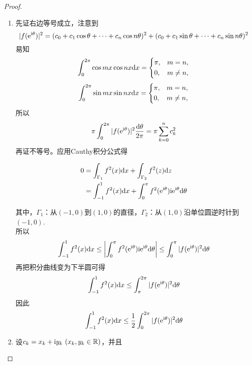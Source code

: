 \begin{proof}

    \begin{enumerate}

        \item 
        先证右边等号成立，注意到
        \[|f(\mathrm{e}^{\mathrm{i} \theta})|^2 = (c_0 + c_1 \cos{\theta} + \cdots + c_n \cos{n\theta})^2 + (c_0 + c_1 \sin{\theta} + \cdots + c_n \sin{n\theta})^2\]
        易知
        \[
            \int_{0}^{2\pi}{\cos{mx}\cos{nx}}\mathrm{d} x = \left\{ 
            \begin{aligned}
                & \pi, & m = n, \\
                & 0, & m \neq n,
            \end{aligned} \right.
        \]
        \[
            \int_{0}^{2\pi}{\sin{mx}\sin{nx}}\mathrm{d} x = \left\{ 
            \begin{aligned}
                & \pi, & m = n, \\
                & 0, & m \neq n,
            \end{aligned} \right.
        \]
        所以
        \[\pi \int_{0}^{2\pi}{|f(\mathrm{e}^{\mathrm{i} \theta})|^2}\dfrac{\mathrm{d} \theta}{2 \pi} = \pi \sum\limits_{k = 0}^{n}{c_k^2}\]
        再证不等号。应用\textup{Cauthy}积分公式得
        
        \begin{align*}
            0 & = \int_{\Gamma_1}{f^2(x)}\mathrm{d} x + \int_{\Gamma_2}{f^2(z)}\mathrm{d} z \\
            & = \int_{-1}^{1}{f^2(x)}\mathrm{d} x + \int_{0}^{\pi}{f^2(\mathrm{e}^{\mathrm{i} \theta})\mathrm{i} \mathrm{e}^{\mathrm{i} \theta}}\mathrm{d} \theta 
        \end{align*}

        其中，$\Gamma_1$：从$(-1, 0)$到$(1, 0)$的直径，$\Gamma_2$：从$(1, 0)$沿单位圆逆时针到$(-1, 0)$. \\
        所以
        \[\int_{-1}^{1}{f^2(x)}\mathrm{d} x \leq \left| \int_{0}^{\pi}{f^2(\mathrm{e}^{\mathrm{i} \theta})\mathrm{i} \mathrm{e}^{\mathrm{i} \theta}}\mathrm{d} \theta \right| \leq \int_{0}^{\pi}{|f(\mathrm{e}^{\mathrm{i} \theta})|^2}\mathrm{d} \theta\]
        再把积分曲线变为下半圆可得
        \[\int_{-1}^{1}{f^2(x)}\mathrm{d} x \leq \int_{\pi}^{2\pi}{|f(\mathrm{e}^{\mathrm{i} \theta})|^2}\mathrm{d} \theta\]
        因此
        \[\int_{-1}^{1}{f^2(x)}\mathrm{d} x \leq \dfrac{1}{2} \int_{0}^{2\pi}{|f(\mathrm{e}^{\mathrm{i} \theta})|^2}\mathrm{d} \theta\]

    \item 
        设$c_k = x_k + \mathrm{i} y_k \ (x_k, y_k \in \mathbb{R})$，并且


\end{enumerate}
\end{proof}
